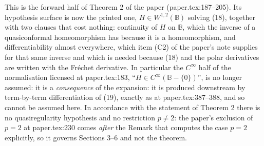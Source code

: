 \begin{theorem}
This is the forward half of Theorem 2 of the paper (paper.tex:187--205).  Its
hypothesis surface is now the printed one, $H\in W^{1,2}(\mathbb{B})$ solving
(18), together with two clauses that cost nothing: continuity of $H$ on
$\mathbb{B}$, which the inverse of a quasiconformal homeomorphism has because
it is a homeomorphism, and differentiability almost everywhere, which item (C2)
of the paper's note supplies for that same inverse and which is needed because
(18) and the polar derivatives are written with the Fr\'echet derivative.  In
particular the $C^\infty$ half of the normalisation licensed at paper.tex:183,
``$H\in C^\infty(\mathbb{B}-\{0\})$'', is no longer assumed: it is a
\emph{consequence} of the expansion: it is produced downstream by term-by-term
differentiation of (19), exactly as at paper.tex:387--388, and so cannot be
assumed here.  In accordance with the statement of
Theorem 2 there is no quasiregularity hypothesis and no restriction $p\neq2$:
the paper's exclusion of $p=2$ at paper.tex:230 comes \emph{after} the Remark
that computes the case $p=2$ explicitly, so it governs Sections 3--6 and not
the theorem.
\end{theorem}
